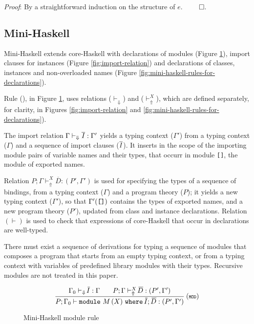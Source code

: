 {\em Proof\/}: By a straightforward induction on the structure of $e$. $\qed$.

\subsection{Mini-Haskell}
\label{sec:mini-Haskell}

Mini-Haskell extends core-Haskell with declarations of modules (Figure
\ref{fig:mini-haskell-module-rule}), import clauses for instances
(Figure \ref{fig:import-relation}) and declarations of classes,
instances and non-overloaded names (Figure
\ref{fig:mini-haskell-rules-for-declarations}).

Rule (\MODULE), in Figure \ref{fig:mini-haskell-module-rule}, uses
relations ($\vdash_{\Downarrow}$) and ($\vdash_{\Uparrow}^X$), which
are defined separately, for clarity, in Figures
\ref{fig:import-relation} and
\ref{fig:mini-haskell-rules-for-declarations}).

The import relation $\Gamma \vdash_{\Downarrow} \overline{I} :
\Gamma'$ yields a typing context ($\Gamma'$) from a typing context
($\Gamma$) and a sequence of import clauses ($\overline{I}$).
It inserts in the scope of the importing module pairs of variable
names and their types, that occurr in module {\tt []}, the module of
exported names. 

Relation $P;\Gamma \vdash_{\Uparrow}^X \overline{\!D}:(P',\Gamma')$ is
used for specifying the types of a sequence of bindings, from a typing
context ($\Gamma$) and a program theory ($P$); it yields a new typing
context ($\Gamma'$), so that $\Gamma'(\mbox{\tt{[]}})$ contains the
types of exported names, and a new program theory ($P'$), updated from
class and instance declarations. Relation $(\vdash)$ is used to
check that expressions of core-Haskell that occur in declarations are
well-typed.

There must exist a sequence of derivations for typing a sequence of
modules that composes a program that starts from an empty typing
context, or from a typing context with variables of predefined library
modules with their types. Recursive modules are not treated in this
paper.

\begin{figure}[b]
\[ \begin{array}{cc}
	\displaystyle\frac
	 {\begin{array}{ll}
           \Gamma_0 \vdash_{\Downarrow} \overline{\!I} : \Gamma\:\: & \:\:P;\Gamma \vdash_{\Uparrow}^X \overline{\!D} : (P',\Gamma') 
          \end{array}}
	 {P;\Gamma_0 \vdash \module\ M\, (\exportC)\ \where\ \overline{\!I};\, \overline{\!D} : (P',\Gamma')} \:(\MODULE)
\end{array} \]
\caption{Mini-Haskell module rule} 
\label{fig:mini-haskell-module-rule}
\end{figure}

